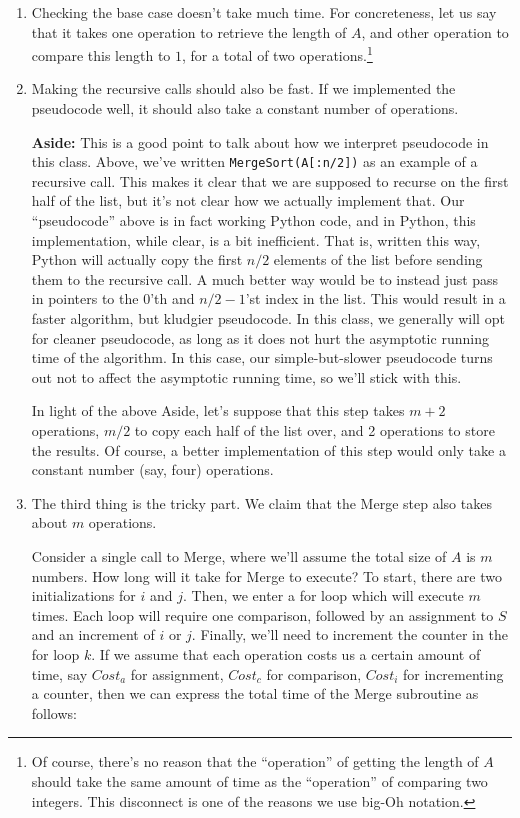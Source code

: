 \documentclass [12pt]{article}
\begin{document}
\begin{enumerate}
    \item Checking the base case doesn't take much time. For concreteness, let us say that it takes one operation to retrieve the length of $A$, and other operation to compare this length to $1$, for a total of two operations.\footnote{Of course, there's no reason that the ``operation'' of getting the length of $A$ should take the same amount of time as the ``operation'' of comparing two integers. This disconnect is one of the reasons we use big-Oh notation.}
    \item Making the recursive calls should also be fast. If we implemented the pseudocode well, it should also take a constant number of operations.

        \textbf{Aside:} This is a good point to talk about how we interpret pseudocode in this class. Above, we've written \texttt{MergeSort(A[:n/2])} as an example of a recursive call. This makes it clear that we are supposed to recurse on the first half of the list, but it's not clear how we actually implement that. Our ``pseudocode'' above is in fact working Python code, and in Python, this implementation, while clear, is a bit inefficient. That is, written this way, Python will actually copy the first $n/2$ elements of the list before sending them to the recursive call. A much better way would be to instead just pass in pointers to the $0$'th and $n/2 - 1$'st index in the list. This would result in a faster algorithm, but kludgier pseudocode. In this class, we generally will opt for cleaner pseudocode, as long as it does not hurt the asymptotic running time of the algorithm. In this case, our simple-but-slower pseudocode turns out not to affect the asymptotic running time, so we'll stick with this.

    In light of the above Aside, let's suppose that this step takes $m + 2$ operations, $m/2$ to copy each half of the list over, and 2 operations to store the results. Of course, a better implementation of this step would only take a constant number (say, four) operations.
    \item The third thing is the tricky part. We claim that the Merge step also takes about $m$ operations.

    Consider a single call to Merge, where we'll assume the total size of $A$ is $m$ numbers. How long will it take for Merge to execute? To start, there are two initializations for $i$ and $j$. Then, we enter a for loop which will execute $m$ times. Each loop will require one comparison, followed by an assignment to $S$ and an increment of $i$ or $j$. Finally, we'll need to increment the counter in the for loop $k$. If we assume that each operation costs us a certain amount of time, say $Cost_a$ for assignment, $Cost_c$ for comparison, $Cost_i$ for incrementing a counter, then we can express the total time of the Merge subroutine as follows:


\end{enumerate}
\end{document}

